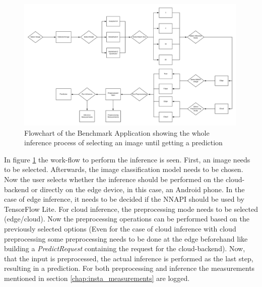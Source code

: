 \begin{figure}[!htb]
\centering
\includegraphics[width=0.99\textwidth]{./Bilder/FlowChart_App.png}
\caption{Flowchart of the Benchmark Application showing the whole inference process of selecting an image until getting a prediction}
\label{fig:app}
\end{figure}
In figure \ref{fig:app} the work-flow to perform the inference is seen. First, an image needs to be selected. Afterwards, the image classification model needs to be chosen. Now the user selects whether the inference should be performed on the cloud-backend or directly on the edge device, in this case, an Android phone. In the case of edge inference, it needs to be decided if the NNAPI should be used by TensorFlow Lite. For cloud inference, the preprocessing mode needs to be selected (edge/cloud). Now the preprocessing operations can be performed based on the previously selected options (Even for the case of cloud inference with cloud preprocessing some preprocessing needs to be done at the edge beforehand like building a \emph{PredictRequest} containing the request for the cloud-backend). Now, that the input is preprocessed, the actual inference is performed as the last step, resulting in a prediction. For both preprocessing and inference the measurements mentioned in section \ref{chap:insta_measurements} are logged.


